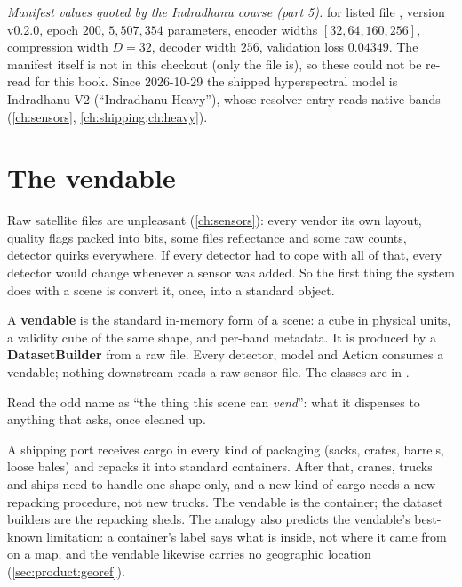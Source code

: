 \begin{drift}
\emph{Manifest values quoted by the Indradhanu course (part 5).}  for
 listed file
, version v0.2.0, epoch $200$, $5{,}507{,}354$
parameters, encoder widths $[32, 64, 160, 256]$, compression width $D = 32$, decoder width $256$,
validation loss $0.04349$. The manifest itself is
not in this checkout (only the  file is), so these could not be re-read for this book.
Since 2026-10-29 the shipped hyperspectral model is Indradhanu V2 (``Indradhanu Heavy''), whose
resolver entry reads native bands (\cref{ch:sensors}, \cref{ch:shipping,ch:heavy}).
\end{drift}

\section{The vendable}\label{sec:product:vendable}

Raw satellite files are unpleasant (\cref{ch:sensors}): every vendor its own layout, quality flags
packed into bits, some files reflectance and some raw counts, detector quirks everywhere. If every
detector had to cope with all of that, every detector would change whenever a sensor was added.
So the first thing the system does with a scene is convert it, once, into a standard object.

\begin{definition}[Vendable]
A \textbf{vendable} is the standard in-memory form of a scene: a cube in physical units, a
validity cube of the same shape, and per-band metadata. It is produced by a
\textbf{DatasetBuilder} from a raw file. Every detector, model and Action
consumes a vendable; nothing downstream reads a raw sensor file. The classes are in
.
\end{definition}

Read the odd name as ``the thing this scene can \emph{vend}'': what it dispenses to anything that
asks, once cleaned up.

\begin{analogy}
A shipping port receives cargo in every kind of packaging (sacks, crates, barrels, loose bales) and
repacks it into standard containers. After that, cranes, trucks and ships need to handle one shape
only, and a new kind of cargo needs a new repacking procedure, not new trucks. The vendable is the
container; the dataset builders are the repacking sheds. The analogy also predicts the vendable's
best-known limitation: a container's label says what is inside, not where it came from on a map,
and the vendable likewise carries no geographic location (\cref{sec:product:georef}).
\end{analogy}

